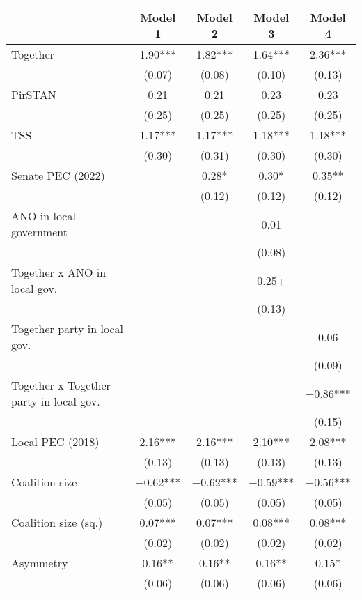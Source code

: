 \begin{table}
\centering
\begin{tabular}[t]{lcccc}
\toprule
  & Model 1 & Model 2 & Model 3 & Model 4\\
\midrule
Together & \num{1.90}*** & \num{1.82}*** & \num{1.64}*** & \num{2.36}***\\
 & (\num{0.07}) & (\num{0.08}) & (\num{0.10}) & (\num{0.13})\\
PirSTAN & \num{0.21} & \num{0.21} & \num{0.23} & \num{0.23}\\
 & (\num{0.25}) & (\num{0.25}) & (\num{0.25}) & (\num{0.25})\\
TSS & \num{1.17}*** & \num{1.17}*** & \num{1.18}*** & \num{1.18}***\\
 & (\num{0.30}) & (\num{0.31}) & (\num{0.30}) & (\num{0.30})\\
Senate PEC (2022) &  & \num{0.28}* & \num{0.30}* & \num{0.35}**\\
 &  & (\num{0.12}) & (\num{0.12}) & (\num{0.12})\\
ANO in local government &  &  & \num{0.01} & \\
 &  &  & (\num{0.08}) & \\
Together x ANO in local gov. &  &  & \num{0.25}+ & \\
 &  &  & (\num{0.13}) & \\
Together party in local gov. &  &  &  & \num{0.06}\\
 &  &  &  & (\num{0.09})\\
Together x Together party in local gov. &  &  &  & \num{-0.86}***\\
 &  &  &  & (\num{0.15})\\
Local PEC (2018) & \num{2.16}*** & \num{2.16}*** & \num{2.10}*** & \num{2.08}***\\
 & (\num{0.13}) & (\num{0.13}) & (\num{0.13}) & (\num{0.13})\\
Coalition size & \num{-0.62}*** & \num{-0.62}*** & \num{-0.59}*** & \num{-0.56}***\\
 & (\num{0.05}) & (\num{0.05}) & (\num{0.05}) & (\num{0.05})\\
Coalition size (sq.) & \num{0.07}*** & \num{0.07}*** & \num{0.08}*** & \num{0.08}***\\
 & (\num{0.02}) & (\num{0.02}) & (\num{0.02}) & \vphantom{1} (\num{0.02})\\
Asymmetry & \num{0.16}** & \num{0.16}** & \num{0.16}** & \num{0.15}*\\
 & (\num{0.06}) & (\num{0.06}) & (\num{0.06}) & (\num{0.06})\\

\end{tabular}
\end{table}
